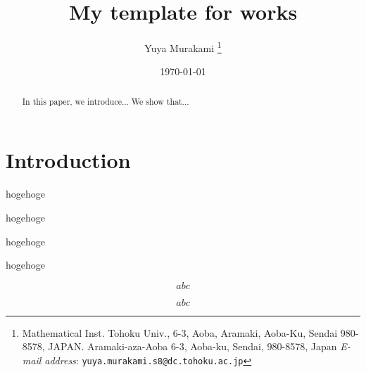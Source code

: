 \documentclass[11pt,a4paper,oneside,lualatex]{article}
\numberwithin{equation}{section} %
\begin{document}

\title{My template for works}
\author{Yuya Murakami
\thanks{Mathematical Inst. Tohoku Univ., 6-3, Aoba, Aramaki, Aoba-Ku, Sendai 980-8578, JAPAN.
	Aramaki-aza-Aoba 6-3, Aoba-ku, Sendai, 980-8578, Japan
	\textit{E-mail address}: \texttt{yuya.murakami.s8@dc.tohoku.ac.jp}}}
\date{\today}

\maketitle


\begin{abstract}
	In this paper, we introduce...
	We show that...
\end{abstract}


\tableofcontents


\section{Introduction} \label{sec:intro}


\begin{thm} \label{thm:main}
	hogehoge
\end{thm}

\begin{thm} \label{thm:main2}
	hogehoge
\end{thm}

\begin{thm} \label{thm:main3}
	hogehoge
\end{thm}

\begin{lem} \label{lem:1}
	hogehoge
\end{lem}

\begin{equation} \label{eq:1}
	abc
\end{equation}

\begin{equation} \label{eq:2}
	abc
\end{equation}
\end{document}
